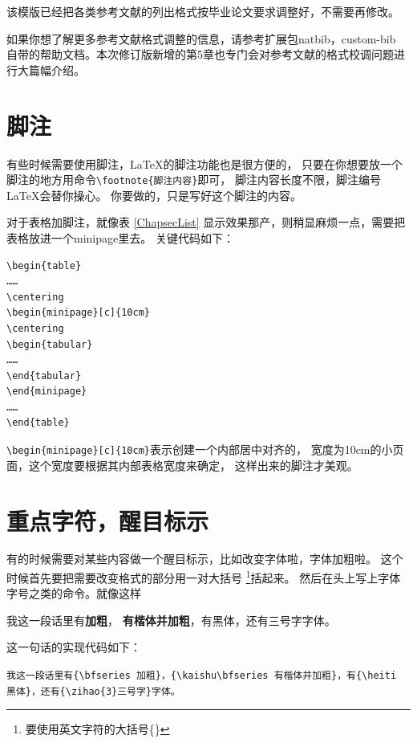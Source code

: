 该模版已经把各类参考文献的列出格式按毕业论文要求调整好，不需要再修改。

如果你想了解更多参考文献格式调整的信息，请参考扩展包natbib，custom-bib
自带的帮助文档。本次修订版新增的第5章也专门会对参考文献的格式校调问题进行大篇幅介绍。

\section{脚注}

有些时候需要使用脚注，\LaTeX 的脚注功能也是很方便的，
只要在你想要放一个脚注的地方用命令\verb+\footnote{脚注内容}+即可，
脚注内容长度不限，脚注编号\LaTeX 会替你操心。
你要做的，只是写好这个脚注的内容。

对于表格加脚注，就像表 \ref{ChapsecList} 显示效果那产，则稍显麻烦一点，需要把表格放进一个minipage里去。
关键代码如下：

{
\linespread{1}
\noindent
\begin{verbatim}
\begin{table}
……
\centering
\begin{minipage}[c]{10cm}
\centering
\begin{tabular}
……
\end{tabular}
\end{minipage}
……
\end{table}
\end{verbatim}
}

\verb+\begin{minipage}[c]{10cm}+表示创建一个内部居中对齐的，
宽度为10cm的小页面，这个宽度要根据其内部表格宽度来确定，
这样出来的脚注才美观。

\section{重点字符，醒目标示}

有的时候需要对某些内容做一个醒目标示，比如改变字体啦，字体加粗啦。
这个时候首先要把需要改变格式的部分用一对大括号
\footnote{要使用英文字符的大括号\{\}}括起来。
然后在头上写上字体字号之类的命令。就像这样

我这一段话里有{\bfseries 加粗}，
{\kaishu\bfseries 有楷体并加粗}，有{\heiti 黑体}，还有{三号字}字体。

这一句话的实现代码如下：

{
\linespread{1}
\noindent
\verb+我这一段话里有{\bfseries 加粗}，{\kaishu\bfseries 有楷体并加粗}，有{\heiti 黑体}，还有{\zihao{3}三号字}字体。+
}

